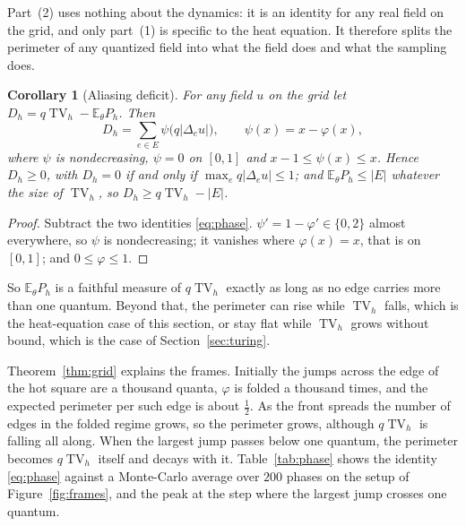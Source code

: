 \documentclass[11pt,a4paper]{article}
\newtheorem{corollary}[theorem]{Corollary}
\theoremstyle{definition}
\theoremstyle{remark}
\newcommand{\E}{\mathbb{E}}
\newcommand{\TV}{\operatorname{TV}}
\begin{document}
Part~(2) uses nothing about the dynamics: it is an identity for any
real field on the grid, and only part~(1) is specific to the heat
equation. It therefore splits the perimeter of any quantized field into
what the field does and what the sampling does.

\begin{corollary}[Aliasing deficit]\label{cor:deficit}
For any field $u$ on the grid let
$D_h=q\TV_h-\E_\theta P_h$. Then
\begin{equation}\label{eq:deficit}
  D_h=\sum_{e\in E}\psi\bigl(q|\Delta_eu|\bigr),\qquad \psi(x)=x-\varphi(x),
\end{equation}
where $\psi$ is nondecreasing, $\psi=0$ on $[0,1]$ and
$x-1\le\psi(x)\le x$. Hence $D_h\ge0$, with $D_h=0$ if and only if
$\max_eq|\Delta_eu|\le1$; and $\E_\theta P_h\le|E|$ whatever the size of
$\TV_h$, so $D_h\ge q\TV_h-|E|$.
\end{corollary}

\begin{proof}
Subtract the two identities \eqref{eq:phase}. $\psi'=1-\varphi'\in\{0,2\}$
almost everywhere, so $\psi$ is nondecreasing; it vanishes where
$\varphi(x)=x$, that is on $[0,1]$; and $0\le\varphi\le1$.
\end{proof}

So $\E_\theta P_h$ is a faithful measure of $q\TV_h$ exactly as long as
no edge carries more than one quantum. Beyond that, the
perimeter can rise while $\TV_h$ falls, which is the heat-equation case
of this section, or stay flat while $\TV_h$ grows without bound, which is
the case of Section~\ref{sec:turing}.

Theorem~\ref{thm:grid} explains the frames. Initially the jumps across
the edge of the hot square are a thousand quanta, $\varphi$ is folded a
thousand times, and the expected perimeter per such edge is about
$\frac12$. As the front spreads the number of edges in the folded regime
grows, so the perimeter grows, although $q\TV_h$ is falling all along.
When the largest jump passes below one quantum, the perimeter becomes
$q\TV_h$ itself and decays with it. Table~\ref{tab:phase} shows the
identity \eqref{eq:phase} against a Monte-Carlo average over $200$
phases on the setup of Figure~\ref{fig:frames}, and the peak at the step
where the largest jump crosses one quantum.
\end{document}
